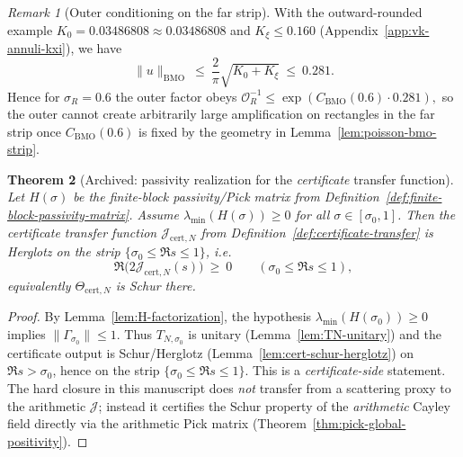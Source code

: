\documentclass[11pt]{article}
\providecommand{\Kzero}{0.03486808}%
\newtheorem{theorem}{Theorem}
\theoremstyle{definition}
\theoremstyle{remark}
\newtheorem{remark}[theorem]{Remark}
\theoremstyle{definition}
\begin{document}
\begin{remark}[Outer conditioning on the far strip]\label{rem:Enorm-numerics}
With the outward-rounded example $K_0=\Kzero\approx 0.03486808$ and $K_\xi\le 0.160$ (Appendix~\ref{app:vk-annuli-kxi}), we have
\[
  \|u\|_{\mathrm{BMO}}\ \le\ \frac{2}{\pi}\sqrt{K_0+K_\xi}\ \le\ 0.281.
\]
Hence for $\sigma_R=0.6$ the outer factor obeys
\(
  \mathcal O_R^{-1}\le \exp(C_{\mathrm{BMO}}(0.6)\cdot 0.281),
\)
so the outer cannot create arbitrarily large amplification on rectangles in the far strip once $C_{\mathrm{BMO}}(0.6)$ is fixed by the geometry in Lemma~\ref{lem:poisson-bmo-strip}.
\end{remark}

\begin{theorem}[Archived: passivity realization for the \emph{certificate} transfer function]\label{thm:passivity-realization}
Let $H(\sigma)$ be the finite-block passivity/Pick matrix from Definition~\ref{def:finite-block-passivity-matrix}. Assume $\lambda_{\min}(H(\sigma))\ge 0$ for all $\sigma\in[\sigma_0,1]$.
Then the certificate transfer function $\mathcal J_{\mathrm{cert},N}$ from Definition~\ref{def:certificate-transfer} is Herglotz on the strip $\{\sigma_0\le \Re s\le 1\}$, i.e.
\[
  \Re\bigl(2\mathcal J_{\mathrm{cert},N}(s)\bigr)\ \ge\ 0
  \qquad(\sigma_0\le \Re s\le 1),
\]
 equivalently $\Theta_{\mathrm{cert},N}$ is Schur there.
\end{theorem}
\begin{proof}
By Lemma~\ref{lem:H-factorization}, the hypothesis $\lambda_{\min}(H(\sigma_0))\ge 0$ implies $\|\Gamma_{\sigma_0}\|\le 1$.
Thus $T_{N,\sigma_0}$ is unitary (Lemma~\ref{lem:TN-unitary}) and the certificate output is Schur/Herglotz (Lemma~\ref{lem:cert-schur-herglotz}) on $\Re s>\sigma_0$, hence on the strip $\{\sigma_0\le \Re s\le 1\}$.
\noindent This is a \emph{certificate-side} statement. The hard closure in this manuscript does \emph{not} transfer from a scattering proxy to the arithmetic $\mathcal J$; instead it certifies the Schur property of the \emph{arithmetic} Cayley field directly via the arithmetic Pick matrix (Theorem~\ref{thm:pick-global-positivity}).
\end{proof}
\end{document}
